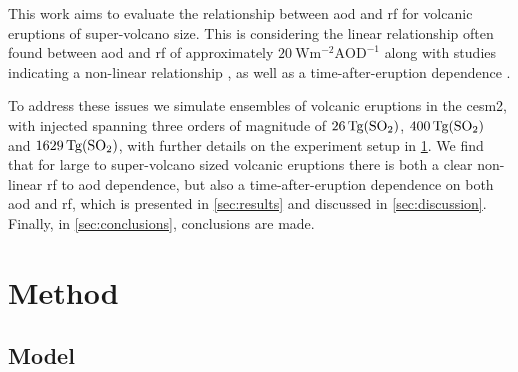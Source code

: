 \documentclass{ametsocV5}
\newcommand{\iso}[1][i]{{#1}njected \ce{SO2}}
\begin{document}

This work aims to evaluate the relationship between \ac{aod} and \ac{rf} for volcanic
eruptions of super-volcano size. This is considering the linear relationship often found
between \ac{aod} and \ac{rf} of approximately
\(\SI{20}{\watt\metre^{-2}\mathrm{AOD}^{-1}}\) \citep{gregory2016, marshall2020,
  mills2017, myhre2013} along with studies indicating a non-linear relationship
\citep{niemeier2015}, as well as a time-after-eruption dependence \citep{marshall2020}.

To address these issues we simulate ensembles of volcanic eruptions in the \ac{cesm2},
with \iso{} spanning three orders of magnitude of \(\SI{26}{\tera\gram(\ce{SO2})}\),
\(\SI{400}{\tera\gram(\ce{SO2})}\) and \(\SI{1629}{\tera\gram(\ce{SO2})}\), with further
details on the experiment setup in \cref{sec:method}. We find that for large to
super-volcano sized volcanic eruptions there is both a clear non-linear \ac{rf} to
\ac{aod} dependence, but also a time-after-eruption dependence on both \ac{aod} and
\ac{rf}, which is presented in \cref{sec:results} and discussed in
\cref{sec:discussion}. Finally, in \cref{sec:conclusions}, conclusions are made.

\section{Method}\label{sec:method}

\subsection{Model}
\end{document}
